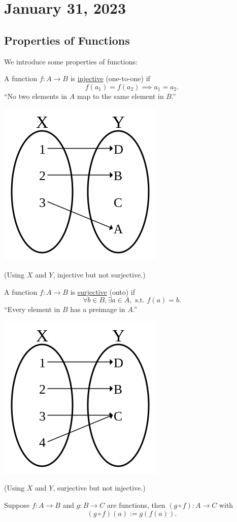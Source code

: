 \section{January 31, 2023}

\subsection{Properties of Functions}
We introduce some properties of functions:
\begin{definition}[Injectivity]
    A function $f: A\to B$ is \ul{injective} (one-to-one) if
    \[f(a_1) = f(a_2)\implies a_1 = a_2.\]
    ``No two elements in $A$ map to the same element in $B$.''
    \begin{center}
        \includegraphics[width=0.2\linewidth]{images/injective.png}

        (Using $X$ and $Y$, injective but not surjective.)
    \end{center}
\end{definition}

\begin{definition}[Surjectivity]
    A function $f: A\to B$ is \ul{surjective} (onto) if
    \[\forall b\in B, \exists a\in A, \text{ s.t. }f(a) = b.\]
    ``Every element in $B$ has a preimage in $A$.''
    \begin{center}
        \includegraphics[width=0.2\linewidth]{images/surjective.png}

        (Using $X$ and $Y$, surjective but not injective.)
    \end{center}
\end{definition}

\begin{definition}
    Suppose $f: A\to B$ and $g: B\to C$ are functions, then $(g\circ f): A\to C$ with
    \[(g\circ f)(a) := g(f(a)).\]
\end{definition}

